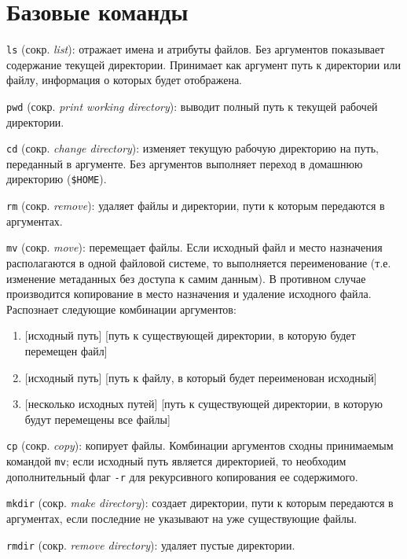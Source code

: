 \documentclass[listings]{labreport}
\begin{document}
\maketitlepage

\section*{Базовые команды}

\texttt{ls} (сокр. \textit{list}): отражает имена и атрибуты файлов.
Без аргументов показывает содержание текущей директории. Принимает как аргумент путь к директории или файлу,
информация о которых будет отображена.

\texttt{pwd} (сокр. \textit{print working directory}): выводит полный путь к текущей рабочей директории.

\texttt{cd} (сокр. \textit{change directory}): изменяет текущую рабочую директорию на путь, переданный в аргументе.
Без аргументов выполняет переход в домашнюю директорию (\texttt{\$HOME}).

\texttt{rm} (сокр. \textit{remove}): удаляет файлы и директории, пути к которым передаются в аргументах.

\texttt{mv} (сокр. \textit{move}): перемещает файлы. Если исходный файл и место назначения
располагаются в одной файловой системе, то выполняется переименование (т.е. изменение метаданных без доступа к самим данным).
В противном случае производится копирование в место назначения и удаление исходного файла. Распознает следующие комбинации аргументов:

\begin{enumerate}
\item {[исходный путь]} [путь к существующей директории, в которую будет перемещен файл]
\item {[исходный путь]} [путь к файлу, в который будет переименован исходный]
\item {[несколько исходных путей]} [путь к существующей директории, в которую будут перемещены все файлы]
\end{enumerate}

\texttt{cp} (сокр. \textit{copy}): копирует файлы. Комбинации аргументов сходны принимаемым командой \texttt{mv}; если исходный путь
является директорией, то необходим дополнительный флаг \texttt{-r} для рекурсивного копирования ее содержимого.

\texttt{mkdir} (сокр. \textit{make directory}): создает директории, пути к которым передаются в аргументах, если последние
не указывают на уже существующие файлы.

\texttt{rmdir} (сокр. \textit{remove directory}): удаляет пустые директории.
\end{document}
